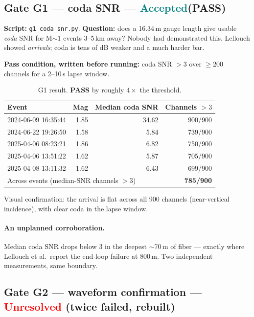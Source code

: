 \documentclass[11pt]{article}
\newcommand{\accepted}{\textcolor{teal}{\textbf{Accepted}}}
\newcommand{\unresolved}{\textcolor{red}{\textbf{Unresolved}}}
\begin{document}
\subsection{Gate G1 --- coda SNR --- \accepted (PASS)}

\textbf{Script:} \texttt{g1\_coda\_snr.py}. \textbf{Question:} does a 16.34\,m
gauge length give usable \emph{coda} SNR for M$\sim$1 events 3--5\,km away?
Nobody had demonstrated this. Lellouch showed \emph{arrivals}; coda is tens of dB
weaker and a much harder bar.

\textbf{Pass condition, written before running:} coda SNR $>3$ over $\ge 200$
channels for a 2--10\,s lapse window.

\begin{table}[H]
\centering
\begin{tabular}{lrrr}
\toprule
Event & Mag & Median coda SNR & Channels $>3$ \\
\midrule
2024-06-09 16:35:44 & 1.85 & 34.62 & 900/900 \\
2024-06-22 19:26:50 & 1.58 &  5.84 & 739/900 \\
2025-04-06 08:23:21 & 1.86 &  6.82 & 750/900 \\
2025-04-06 13:51:22 & 1.62 &  5.87 & 705/900 \\
2025-04-08 13:11:32 & 1.62 &  6.43 & 699/900 \\
\midrule
\multicolumn{3}{l}{Across events (median-SNR channels $>3$)} & \textbf{785/900} \\
\bottomrule
\end{tabular}
\caption{G1 result. \textbf{PASS} by roughly $4\times$ the threshold.}
\end{table}

Visual confirmation: the arrival is flat across all 900 channels (near-vertical
incidence), with clear coda in the lapse window.

\paragraph{An unplanned corroboration.} Median coda SNR drops below 3 in the
deepest $\sim$70\,m of fiber --- exactly where Lellouch et al.\ report the end-loop
failure at 800\,m. Two independent measurements, same boundary.

\subsection{Gate G2 --- waveform confirmation --- \unresolved{} (twice failed, rebuilt)}
\end{document}
